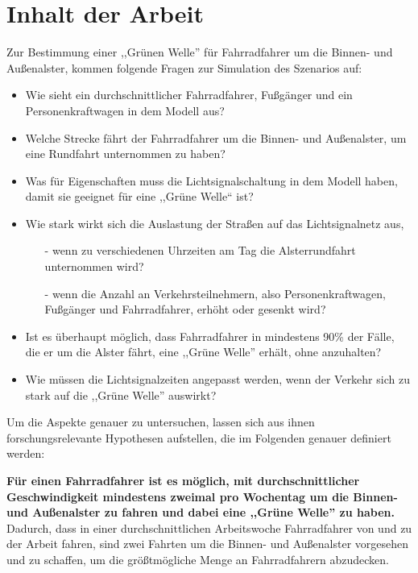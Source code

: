 %
%
\section{Inhalt der Arbeit}

Zur Bestimmung einer ,,Grünen Welle'' für Fahrradfahrer um die Binnen- und Außenalster, kommen folgende Fragen zur Simulation des Szenarios auf:

\begin{itemize}
    \item Wie sieht ein durchschnittlicher Fahrradfahrer, Fußgänger und ein Personenkraftwagen in dem Modell aus?
    \item Welche Strecke fährt der Fahrradfahrer um die Binnen- und Außenalster, um eine Rundfahrt unternommen zu haben?
    \item Was für Eigenschaften muss die Lichtsignalschaltung in dem Modell haben, damit sie geeignet für eine ,,Grüne Welle`` ist?
    \item Wie stark wirkt sich die Auslastung der Straßen auf das Lichtsignalnetz aus,
    \begin{itemize}
        \item[-] wenn zu verschiedenen Uhrzeiten am Tag die Alsterrundfahrt unternommen wird?
        \item[-] wenn die Anzahl an Verkehrsteilnehmern, also Personenkraftwagen, Fußgänger und Fahrradfahrer, erhöht oder gesenkt wird?
    \end{itemize}
    \item Ist es überhaupt möglich, dass Fahrradfahrer in mindestens 90\% der Fälle, die er um die Alster fährt, eine ,,Grüne Welle'' erhält, ohne anzuhalten?
    \item Wie müssen die Lichtsignalzeiten angepasst werden, wenn der Verkehr sich zu stark auf die ,,Grüne Welle'' auswirkt?
\end{itemize}

Um die Aspekte genauer zu untersuchen, lassen sich aus ihnen forschungsrelevante Hypothesen aufstellen, die im Folgenden genauer definiert werden:

\textbf{Für einen Fahrradfahrer ist es möglich, mit durchschnittlicher Geschwindigkeit mindestens zweimal pro Wochentag um die Binnen- und Außenalster zu fahren und dabei eine ,,Grüne Welle'' zu haben.}
Dadurch, dass in einer durchschnittlichen Arbeitswoche Fahrradfahrer von und zu der Arbeit fahren, sind zwei Fahrten um die Binnen- und Außenalster vorgesehen und zu schaffen, um die größtmögliche Menge an Fahrradfahrern abzudecken.

